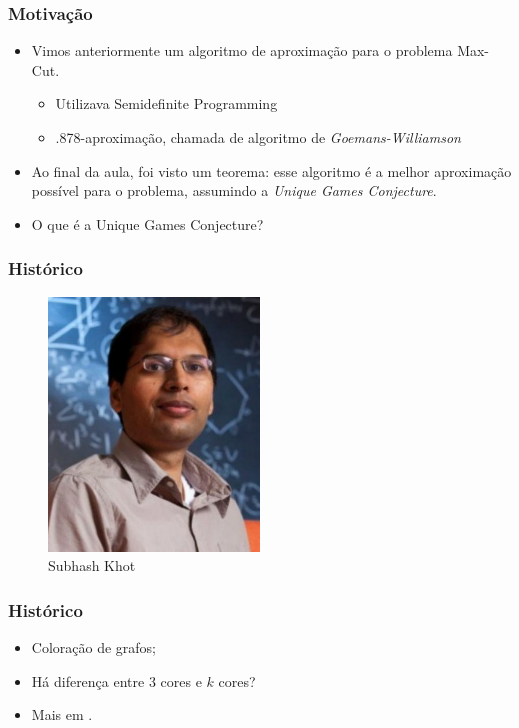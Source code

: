 \documentclass[11pt, handout]{beamer}
\begin{document}
\begin{frame}[<+->]
  \frametitle{Motivação}

  \begin{itemize}
    \item Vimos anteriormente um algoritmo de aproximação para o problema Max-Cut.
    \begin{itemize}
        \item Utilizava Semidefinite Programming
        \item .878-aproximação, chamada de algoritmo de \emph{Goemans-Williamson}
    \end{itemize}
    \item Ao final da aula, foi visto um teorema: esse algoritmo é a melhor aproximação possível para o problema, assumindo a \emph{Unique Games Conjecture}.
    \item O que é a Unique Games Conjecture?
  \end{itemize}

\end{frame}

\begin{frame}
    \frametitle{Histórico}
    
    \begin{figure}
        \centering
        \includegraphics[width=0.5\textwidth]{images/subhash.jpg}
        \caption*{Subhash Khot}
    \end{figure}{}
    
\end{frame}

\begin{frame}
    \frametitle{Histórico}
    
    \begin{itemize}
        \item Coloração de grafos;
        \item Há diferença entre 3 cores e $k$ cores?
        \item Mais em \cite{history}.
    \end{itemize}
    
\end{frame}
\end{document}
